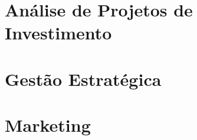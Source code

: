 \documentclass[11pt]{article}
\begin{document}
\newpage

\section{Análise de Projetos de Investimento}

\section{Gestão Estratégica}

\section{Marketing}
\end{document}
